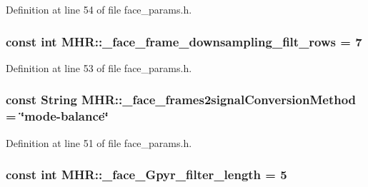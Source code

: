 Definition at line 54 of file face\+\_\+params.\+h.

\hypertarget{namespace_m_h_r_a7fa6df2df062c81344149450be58164a}{
\subsubsection[{\+\_\+face\+\_\+frame\+\_\+downsampling\+\_\+filt\+\_\+rows}]{\setlength{\rightskip}{0pt plus 5cm}const int M\+H\+R\+::\+\_\+face\+\_\+frame\+\_\+downsampling\+\_\+filt\+\_\+rows = 7}}\label{namespace_m_h_r_a7fa6df2df062c81344149450be58164a}


Definition at line 53 of file face\+\_\+params.\+h.

\hypertarget{namespace_m_h_r_a634c25b34e7aa6bbb3cfc346964d2f90}{
\subsubsection[{\+\_\+face\+\_\+frames2signal\+Conversion\+Method}]{\setlength{\rightskip}{0pt plus 5cm}const String M\+H\+R\+::\+\_\+face\+\_\+frames2signal\+Conversion\+Method = \char`\"{}mode-\/balance\char`\"{}}}\label{namespace_m_h_r_a634c25b34e7aa6bbb3cfc346964d2f90}


Definition at line 51 of file face\+\_\+params.\+h.

\hypertarget{namespace_m_h_r_a7eabffdab2df22a98e5aa4046d6c3baf}{
\subsubsection[{\+\_\+face\+\_\+\+Gpyr\+\_\+filter\+\_\+length}]{\setlength{\rightskip}{0pt plus 5cm}const int M\+H\+R\+::\+\_\+face\+\_\+\+Gpyr\+\_\+filter\+\_\+length = 5}}\label{namespace_m_h_r_a7eabffdab2df22a98e5aa4046d6c3baf}


